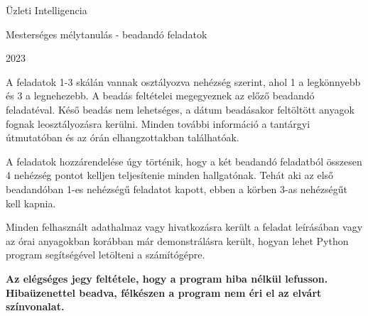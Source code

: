 \documentclass[english]{article}
\begin{document}
\begin{titlepage}
\centering

\vspace{4cm} 

\Huge

Üzleti Intelligencia

\vspace{2cm} 

\Large

Mesterséges mélytanulás - beadandó feladatok

\vspace{0.5cm}

2023 %

\vspace{2cm} 

\normalsize

A feladatok 1-3 skálán vannak osztályozva nehézség szerint, ahol 1 a legkönnyebb és 3 a legnehezebb. A beadás feltételei megegyeznek az előző beadandó feladatéval. Késő beadás nem lehetséges, a dátum beadásakor feltöltött anyagok fognak leosztályozásra kerülni. Minden további információ a tantárgyi útmutatóban és az órán elhangzottakban találhatóak.
\par\medskip
A feladatok hozzárendelése úgy történik, hogy a két beadandó feladatból összesen 4 nehézség pontot kelljen teljesítenie minden hallgatónak. Tehát aki az első beadandóban 1-es nehézségű feladatot kapott, ebben a körben 3-as nehézségűt kell kapnia.
\par\medskip
Minden felhasznált adathalmaz vagy hivatkozásra került a feladat leírásában vagy az órai anyagokban korábban már demonstrálásra került, hogyan lehet Python program segítségével letölteni a számítógépre.
\par\medskip
\textbf{Az elégséges jegy feltétele, hogy a program hiba nélkül lefusson. Hibaüzenettel beadva, félkészen a program nem éri el az elvárt színvonalat.}
\end{titlepage}
\end{document}
